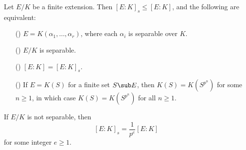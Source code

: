 \begin{proposition}\label{field ext finite separable iff}
Let $E/K$ be a finite extension. Then $[E:K]_s\leq [E:K]$, and the following are equivalent:
\begin{itemize}
\item[(\rmnum{1})] $E=K(\alpha_1,\dots,\alpha_r)$, where each $\alpha_i$ is separable over $K$.
\item[(\rmnum{2})] $E/K$ is separable.
\item[(\rmnum{3})] $[E:K]=[E:K]_s$.
\item[(\rmnum{4})] If $E=K(S)$ for a finite set $S\sub E$, then $K(S)=K(S^{p^n})$ for some $n\geq 1$, in which case $K(S)=K(S^{p^n})$ for all $n\geq 1$.
\end{itemize}
If $E/K$ is not separable, then
\[[E:K]_s=\frac{1}{p^e}[E:K]\]
for some integer $e\geq 1$.
\end{proposition}
